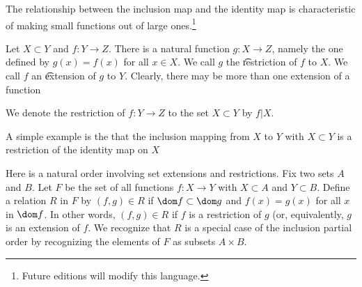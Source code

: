 

The relationship between the inclusion map and the identity map is characteristic of making small functions out of large ones.\footnote{Future editions will modify this language.}


Let $X \subset Y$ and $f: Y \to Z$.
There is a natural function $g: X \to Z$, namely the one defined by $g(x) = f(x)$ for all $x \in X$.
We call $g$ the \t{restriction} of $f$ to $X$.
We call $f$ an \t{extension} of $g$ to $Y$.
Clearly, there may be more than one extension of a function


We denote the restriction of $f: Y \to Z$ to the set $X \subset Y$ by $f|X$.


A simple example is the that the inclusion mapping from $X$ to $Y$ with $X \subset Y$ is a restriction of the identity map on $X$


Here is a natural order involving set extensions and restrictions.
Fix two sets $A$ and $B$.
Let $F$ be the set of all functions $f: X \to Y$ with $X \subset A$ and $Y \subset B$.
Define a relation $R$ in $F$ by $(f, g) \in R$ if $\dom f \subset \dom g$ and $f(x) = g(x)$ for all $x$ in $\dom f$.
In other words, $(f, g) \in R$ if $f$ is a restriction of $g$ (or, equivalently, $g$ is an extension of $f$.
We recognize that $R$ is a special case of the inclusion partial order by recognizing the elements of $F$ as subsets $A \times B$.

